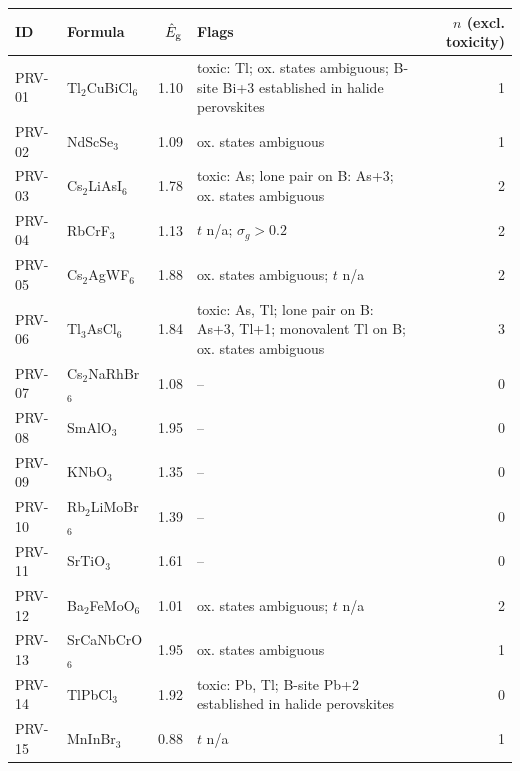 \begin{tabular}{@{}llrp{8cm}r@{}}\toprule
ID & Formula & $\hat E_{\rm g}$ & Flags & $n$ (excl. toxicity)\\\midrule
PRV-01 & Tl$_{2}$CuBiCl$_{6}$ & 1.10 & toxic: Tl; ox. states ambiguous; B-site Bi+3 established in halide perovskites & 1 \\
PRV-02 & NdScSe$_{3}$ & 1.09 & ox. states ambiguous & 1 \\
PRV-03 & Cs$_{2}$LiAsI$_{6}$ & 1.78 & toxic: As; lone pair on B: As+3; ox. states ambiguous & 2 \\
PRV-04 & RbCrF$_{3}$ & 1.13 & $t$ n/a; $\sigma_g>0.2$ & 2 \\
PRV-05 & Cs$_{2}$AgWF$_{6}$ & 1.88 & ox. states ambiguous; $t$ n/a & 2 \\
PRV-06 & Tl$_{3}$AsCl$_{6}$ & 1.84 & toxic: As, Tl; lone pair on B: As+3, Tl+1; monovalent Tl on B; ox. states ambiguous & 3 \\
PRV-07 & Cs$_{2}$NaRhBr$_{6}$ & 1.08 & -- & 0 \\
PRV-08 & SmAlO$_{3}$ & 1.95 & -- & 0 \\
PRV-09 & KNbO$_{3}$ & 1.35 & -- & 0 \\
PRV-10 & Rb$_{2}$LiMoBr$_{6}$ & 1.39 & -- & 0 \\
PRV-11 & SrTiO$_{3}$ & 1.61 & -- & 0 \\
PRV-12 & Ba$_{2}$FeMoO$_{6}$ & 1.01 & ox. states ambiguous; $t$ n/a & 2 \\
PRV-13 & SrCaNbCrO$_{6}$ & 1.95 & ox. states ambiguous & 1 \\
PRV-14 & TlPbCl$_{3}$ & 1.92 & toxic: Pb, Tl; B-site Pb+2 established in halide perovskites & 0 \\
PRV-15 & MnInBr$_{3}$ & 0.88 & $t$ n/a & 1 \\
\bottomrule\end{tabular}
